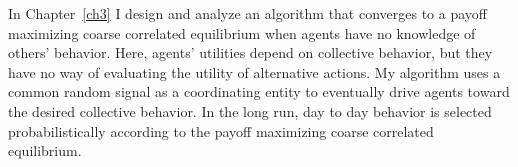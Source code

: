 





In Chapter~\ref{ch3} I design and analyze an algorithm that converges to a payoff maximizing coarse correlated equilibrium when agents have no knowledge of others' behavior. Here, agents' utilities depend on collective behavior, but they have no way of evaluating the utility of alternative actions. My algorithm uses a common random signal as a coordinating entity to eventually drive agents toward the desired collective behavior. In the long run, day to day behavior is selected probabilistically according to the payoff maximizing coarse correlated equilibrium.

 


\smallskip

